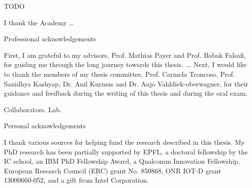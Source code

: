 TODO

I thank the Academy \dots

Professional acknowledgements

First, I am grateful to my advisors, Prof. Mathias Payer and Prof. Babak Falsafi,
for guiding me through the long journey towards this thesis.
...
Next, I would like to thank the members of my thesis committee, 
Prof. Carmela Troncoso, 
Prof. Sanidhya Kashyap,
Dr. Anil Kurmus and 
Dr. Anjo Vahldiek-oberwagner,
for their guidance and feedback during the writing of this thesis
and during the oral exam.

Collaborators.
Lab.

Personal acknowledgements


I thank various sources for helping fund the research described in this thesis.
My PhD research has been partially supported by 
EPFL, 
a doctoral fellowship by the IC school,
an IBM PhD Fellowship Award,
a Qualcomm Innovation Fellowship,
European Research Council (ERC) grant No. 850868,
ONR IOT-D grant 13000660-052, and
a gift from Intel Corporation.
